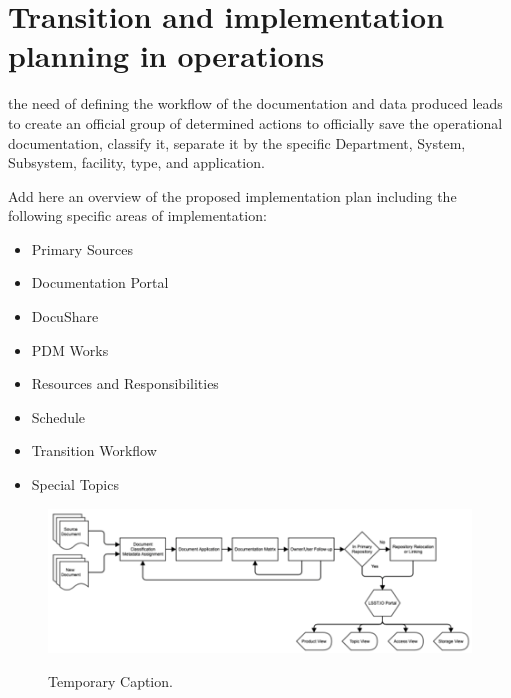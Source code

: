 \section{Transition and implementation planning in operations}
\label{sec:implementation}

the need of defining the workflow of the documentation and data produced leads to create an official group of determined actions to officially save the operational documentation, classify it, separate it by the specific Department, System, Subsystem, facility, type, and application. 

Add here an overview of the proposed implementation plan including the following specific areas of implementation:

\begin{itemize}

\item Primary Sources
\item Documentation Portal
\item DocuShare
\item PDM Works
\item Resources and Responsibilities
\item Schedule
\item Transition Workflow
\item Special Topics

\end{itemize}

\begin{figure}[t]
\caption{Temporary Caption.}
\centering
\includegraphics[width=\textwidth]{operations-documentation-workflow-temp}
\label{fig:operations-documentation-workflow}
\end{figure}
